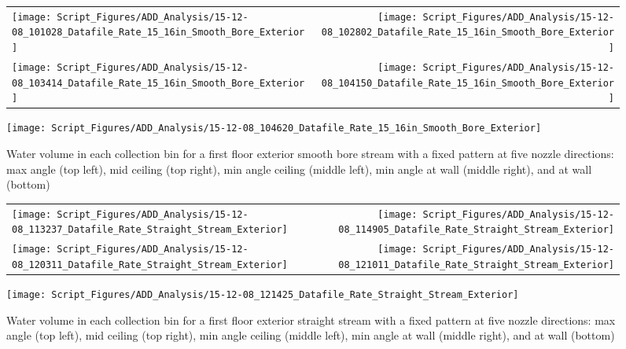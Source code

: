 \documentclass{book}
\begin{document}
\begin{figure}[ht]
\begin{tabular*}{\textwidth}{lr}
\texttt{[image: Script\_Figures/ADD\_Analysis/15-12-08\_101028\_Datafile\_Rate\_15\_16in\_Smooth\_Bore\_Exterior]} &
\texttt{[image: Script\_Figures/ADD\_Analysis/15-12-08\_102802\_Datafile\_Rate\_15\_16in\_Smooth\_Bore\_Exterior]} \\
\texttt{[image: Script\_Figures/ADD\_Analysis/15-12-08\_103414\_Datafile\_Rate\_15\_16in\_Smooth\_Bore\_Exterior]} &
\texttt{[image: Script\_Figures/ADD\_Analysis/15-12-08\_104150\_Datafile\_Rate\_15\_16in\_Smooth\_Bore\_Exterior]} \\
\end{tabular*}
\centering
\texttt{[image: Script\_Figures/ADD\_Analysis/15-12-08\_104620\_Datafile\_Rate\_15\_16in\_Smooth\_Bore\_Exterior]} \\
\caption{Water volume in each collection bin for a first floor exterior smooth bore stream with a fixed pattern at five nozzle directions: max angle (top left), mid ceiling (top right), min angle ceiling (middle left), min angle at wall (middle right), and at wall (bottom)}
\label{fig:Exterior_First_Floor_Varying_Nozzle_Directions_SB_Fixed_Pattern}
\end{figure}

\begin{figure}[ht]
\begin{tabular*}{\textwidth}{lr}
\texttt{[image: Script\_Figures/ADD\_Analysis/15-12-08\_113237\_Datafile\_Rate\_Straight\_Stream\_Exterior]} &
\texttt{[image: Script\_Figures/ADD\_Analysis/15-12-08\_114905\_Datafile\_Rate\_Straight\_Stream\_Exterior]} \\
\texttt{[image: Script\_Figures/ADD\_Analysis/15-12-08\_120311\_Datafile\_Rate\_Straight\_Stream\_Exterior]} &
\texttt{[image: Script\_Figures/ADD\_Analysis/15-12-08\_121011\_Datafile\_Rate\_Straight\_Stream\_Exterior]} \\
\end{tabular*}
\centering
\texttt{[image: Script\_Figures/ADD\_Analysis/15-12-08\_121425\_Datafile\_Rate\_Straight\_Stream\_Exterior]} \\
\caption{Water volume in each collection bin for a first floor exterior straight stream with a fixed pattern at five nozzle directions: max angle (top left), mid ceiling (top right), min angle ceiling (middle left), min angle at wall (middle right), and at wall (bottom)}
\label{fig:Exterior_First_Floor_Varying_Nozzle_Directions_SS_Fixed_Pattern}
\end{figure}
\end{document}
